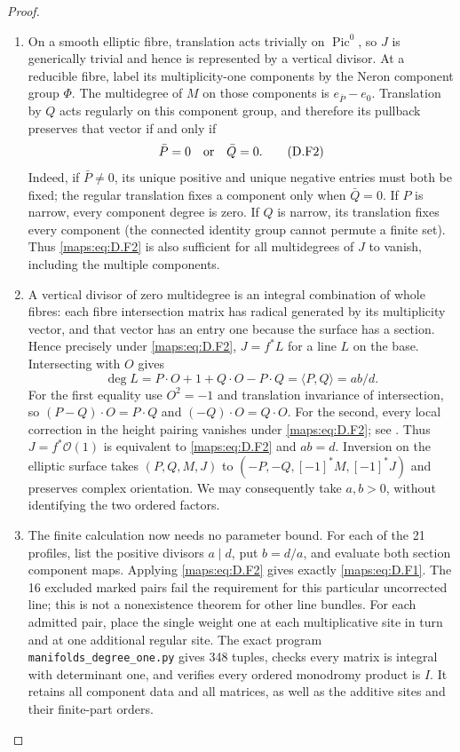 \begin{proof}
\begin{enumerate}[label=\arabic*.,leftmargin=*]
\item On a smooth elliptic fibre, translation acts trivially
on $\operatorname{Pic}^0$, so $J$ is generically trivial
and hence is represented by a vertical divisor.
At a reducible fibre, label its multiplicity-one
components by the Neron component group $\Phi$.
The multidegree of $M$ on those components is
$e_{\bar P}-e_0$. Translation by $Q$ acts regularly
on this component group, and therefore its pullback
preserves that vector if and only if
\[
                         \bar P=0\quad\hbox{or}\quad\bar Q=0.
 \tag{D.F2}\label{maps:eq:D.F2}
\]
Indeed, if $\bar P\ne0$, its unique positive and unique
negative entries must both be fixed; the regular
translation fixes a component only when $\bar Q=0$.
If $P$ is narrow, every component degree is zero.
If $Q$ is narrow, its translation fixes every component
(the connected identity group cannot permute a finite
set). Thus \eqref{maps:eq:D.F2} is also sufficient for all multidegrees
of $J$ to vanish, including the multiple components.

\item A vertical divisor of zero multidegree is an integral
combination of whole fibres: each fibre intersection
matrix has radical generated by its multiplicity vector,
and that vector has an entry one because the surface has
a section. Hence precisely under \eqref{maps:eq:D.F2}, $J=f^*L$ for
a line $L$ on the base. Intersecting with $O$ gives
\[
 \deg L=P\cdot O+1+Q\cdot O-P\cdot Q
        =\langle P,Q\rangle=ab/d.
\]
For the first equality use $O^2=-1$ and translation
invariance of intersection, so
$(P-Q)\cdot O=P\cdot Q$ and $(-Q)\cdot O=Q\cdot O$.
For the second, every local correction in the height
pairing vanishes under \eqref{maps:eq:D.F2}; see
\cite[Section 11.8]{manSS10}.
Thus $J=f^*\mathcal O(1)$ is equivalent to \eqref{maps:eq:D.F2} and
$ab=d$. Inversion on the elliptic surface takes
$(P,Q,M,J)$ to $(-P,-Q,[-1]^*M,[-1]^*J)$ and preserves
complex orientation. We may consequently take $a,b>0$,
without identifying the two ordered factors.

\item The finite calculation now needs no parameter bound.
For each of the 21 profiles, list the positive divisors
$a\mid d$, put $b=d/a$, and evaluate both section
component maps. Applying \eqref{maps:eq:D.F2} gives exactly \eqref{maps:eq:D.F1}.
The 16 excluded marked pairs fail the requirement for
this particular uncorrected line; this is not a
nonexistence theorem for other line bundles.
For each admitted pair, place the single weight one
at each multiplicative site in turn and at one
additional regular site. The exact program
\texttt{manifolds\_degree\_one.py} gives 348 tuples,
checks every matrix is integral with determinant one,
and verifies every ordered monodromy product is $I$.
It retains all component data and all matrices, as well
as the additive sites and their finite-part orders.


\end{enumerate}
\end{proof}

